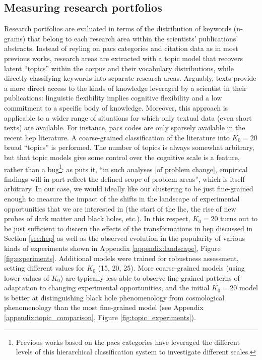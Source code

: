 \documentclass{article}
\begin{document}
\subsection{\label{sec:topics}Measuring research portfolios}

Research portfolios are evaluated in terms of the distribution of keywords (n-grams) that belong to each research area within the scientists' publications' abstracts. Instead of reyling on \gls{pacs} categories and citation data as in most previous works, research areas are extracted with a topic model that recovers latent ``topics'' within the corpus and their vocabulary distributions, while directly classifying keywords into separate research areas. Arguably, texts provide a more direct access to the kinds of knowledge leveraged by a scientist in their publications: linguistic flexibility implies cognitive flexibility and a low commitment to a specific body of knowledge. Moreover, this approach is applicable to a wider range of situations for which only textual data (even short texts) are available. For instance, \gls{pacs} codes are only sparsely available in the recent \gls{hep} literature. A coarse-grained classification of the literature into $K_0=20$ broad ``topics'' is performed. The number of topics is always somewhat arbitrary, but that topic models give some control over the cognitive scale is a feature, rather than a bug\footnote{Previous works based on the \gls{pacs} categories have leveraged the different levels of this hierarchical classification system to investigate different scales.}: as \citet{Gieryn1978} puts it, ``in such analyses [of problem change], empirical findings will in part reflect the defined scope of problem areas'', which is itself arbitrary. In our case, we would ideally like our clustering to be just fine-grained enough to measure the impact of the shifts in the landscape of experimental opportunities that we are interested in (the start of the \gls{lhc}, the rise of new probes of dark matter and black holes, etc.). In this respect, $K_0=20$ turns out to be just sufficient to discern the effects of the transformations in \gls{hep} discussed in Section \ref{sec:hep} as well as the observed evolution in the popularity of various kinds of experiments shown in Appendix \ref{appendix:landscape}, Figure \ref{fig:experiments}. Additional models were trained for robustness assessment, setting different values for $K_0$ (15, 20, 25). More coarse-grained models (using lower values of $K_0$) are typically less able to observe fine-grained patterns of adaptation to changing experimental opportunities, and the initial $K_0=20$ model is better at distinguishing black hole phenomenology from cosmological phenomenology than the most fine-grained model (see Appendix \ref{appendix:topic_comparison}, Figure \ref{fig:topic_experiments}).
\end{document}
